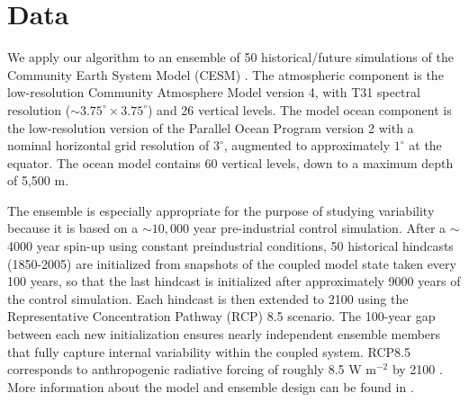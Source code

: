 \documentclass{ametsoc}
\begin{document}


\section{Data}
\label{sec:data}

We apply our algorithm to an ensemble of 50 historical/future simulations of the Community Earth System Model (CESM) \citep{sriver2015effects}.  The atmospheric component is the low-resolution Community Atmosphere Model version 4, with T31 spectral resolution (${\sim}3.75^\circ \times 3.75^\circ$) and 26 vertical levels. The model ocean component is the low-resolution version of the Parallel Ocean Program version 2 \citep{smith2010parallel} with a nominal horizontal grid resolution of $3^\circ$, augmented to approximately $1^\circ$ at the equator. The ocean model contains 60 vertical levels, down to a maximum depth of 5,500 m. 

The ensemble is especially appropriate for the purpose of studying variability because it is based on a ${\sim}10,000$ year pre-industrial control simulation. After a $\sim$4000 year spin-up using constant preindustrial conditions, 50 historical hindcasts (1850-2005) are initialized from snapshots of the coupled model state taken every 100 years, so that the last hindcast is initialized after approximately 9000 years of the control simulation. Each hindcast is then extended to 2100 using the Representative Concentration Pathway (RCP) 8.5 scenario. The 100-year gap between each new initialization ensures nearly independent ensemble members that fully capture internal variability within the coupled system. RCP8.5 corresponds to anthropogenic radiative forcing of roughly 8.5 W m$^{-2}$ by 2100 \citep{moss2010next}. More information about the model and ensemble design can be found in \citet{sriver2015effects}.

\end{document}
